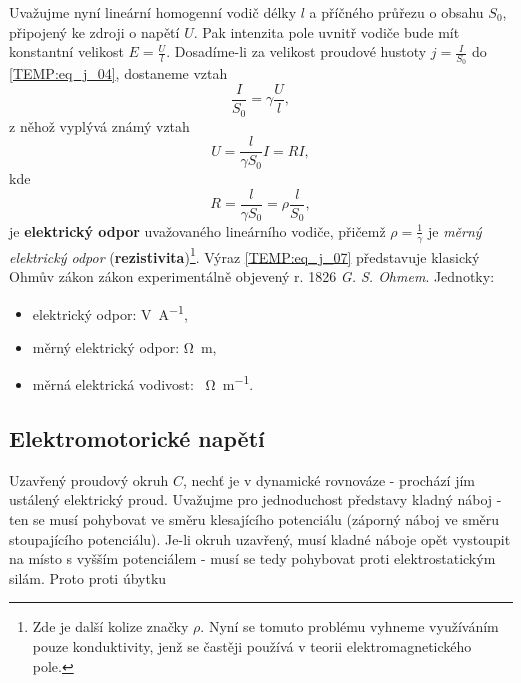      Uvažujme nyní lineární homogenní vodič délky $l$ a příčného průřezu o obsahu $S_0$, připojený
      ke zdroji o napětí $U$. Pak intenzita pole uvnitř vodiče bude mít konstantní velikost
      $E=\frac{U}{l}$. Dosadíme-li za velikost proudové hustoty $j=\frac{I}{S_0}$ do
      \ref{TEMP:eq_j_04}, dostaneme vztah
      \begin{equation}\label{TEMP:eq_j_05}
        \frac{I}{S_0} = \gamma\frac{U}{l},
      \end{equation}        
      z něhož vyplývá známý vztah
      \begin{equation}\label{TEMP:eq_j_06}
        U = \frac{l}{\gamma S_0}I = RI,
      \end{equation}              
      kde
      \begin{equation}\label{TEMP:eq_j_07}
        R = \frac{l}{\gamma S_0} = \rho\frac{l}{S_0},
      \end{equation} 
      je \textbf{elektrický odpor} uvažovaného lineárního vodiče, přičemž $\rho = \frac{1}{\gamma}$
      je \emph{měrný elektrický odpor} (\textbf{rezistivita})\footnote{Zde je další kolize značky
      $\rho$. Nyní se tomuto problému vyhneme využíváním pouze konduktivity, jenž se častěji
      používá v teorii elektromagnetického pole.}. Výraz \ref{TEMP:eq_j_07} představuje klasický
      Ohmův zákon zákon experimentálně objevený r. 1826 \emph{G. S. Ohmem}. Jednotky:
      \begin{itemize}[noitemsep]
        \item elektrický odpor: \si{\V\per\A},
        \item měrný elektrický odpor: \si{\ohm\m},
        \item měrná elektrická vodivost: \si{\per\ohm\per\m}.
      \end{itemize}

        

    \subsection{Elektromotorické napětí}
      Uzavřený proudový okruh $C$, nechť je v dynamické rovnováze - prochází jím ustálený
      elektrický proud. Uvažujme pro jednoduchost představy kladný náboj - ten se musí pohybovat ve
      směru klesajícího potenciálu (záporný náboj ve směru stoupajícího potenciálu). Je-li okruh
      uzavřený, musí kladné náboje opět vystoupit na místo s vyšším potenciálem - musí se tedy
      pohybovat proti elektrostatickým silám. Proto proti úbytku      
               
